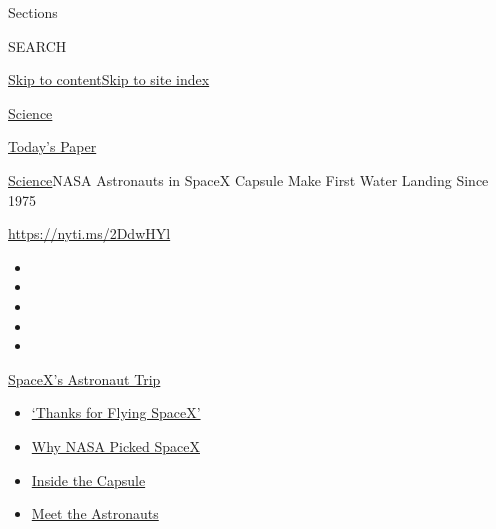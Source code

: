 Sections

SEARCH

\protect\hyperlink{site-content}{Skip to
content}\protect\hyperlink{site-index}{Skip to site index}

\href{https://www.nytimes3xbfgragh.onion/section/science}{Science}

\href{https://myaccount.nytimes3xbfgragh.onion/auth/login?response_type=cookie\&client_id=vi}{}

\href{https://www.nytimes3xbfgragh.onion/section/todayspaper}{Today's
Paper}

\href{/section/science}{Science}\textbar{}NASA Astronauts in SpaceX
Capsule Make First Water Landing Since 1975

\url{https://nyti.ms/2DdwHYl}

\begin{itemize}
\item
\item
\item
\item
\item
\end{itemize}

\href{https://www.nytimes3xbfgragh.onion/2020/08/02/science/spacex-astronauts-splashdown.html?action=click\&pgtype=Article\&state=default\&region=TOP_BANNER\&context=storylines_menu}{SpaceX's
Astronaut Trip}

\begin{itemize}
\tightlist
\item
  \href{https://www.nytimes3xbfgragh.onion/2020/08/02/science/spacex-astronauts-splashdown.html?action=click\&pgtype=Article\&state=default\&region=TOP_BANNER\&context=storylines_menu}{`Thanks
  for Flying SpaceX'}
\item
  \href{https://www.nytimes3xbfgragh.onion/2020/05/26/science/spacex-launch-nasa.html?action=click\&pgtype=Article\&state=default\&region=TOP_BANNER\&context=storylines_menu}{Why
  NASA Picked SpaceX}
\item
  \href{https://www.nytimes3xbfgragh.onion/interactive/2020/05/26/science/spacex-nasa.html?action=click\&pgtype=Article\&state=default\&region=TOP_BANNER\&context=storylines_menu}{Inside
  the Capsule}
\item
  \href{https://www.nytimes3xbfgragh.onion/2020/05/27/science/bob-behnken-doug-hurley.html?action=click\&pgtype=Article\&state=default\&region=TOP_BANNER\&context=storylines_menu}{Meet
  the Astronauts}
\end{itemize}

